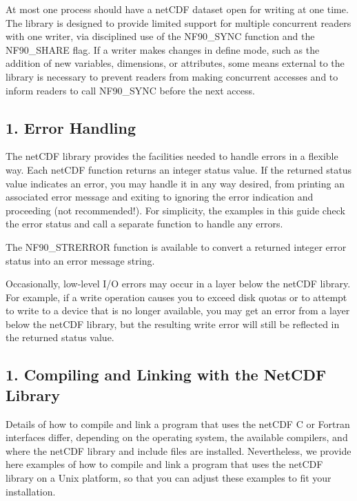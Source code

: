 At most one process should have a net\+C\+DF dataset open for writing at one time. The library is designed to provide limited support for multiple concurrent readers with one writer, via disciplined use of the N\+F90\+\_\+\+S\+Y\+NC function and the N\+F90\+\_\+\+S\+H\+A\+RE flag. If a writer makes changes in define mode, such as the addition of new variables, dimensions, or attributes, some means external to the library is necessary to prevent readers from making concurrent accesses and to inform readers to call N\+F90\+\_\+\+S\+Y\+NC before the next access.\hypertarget{f90-use-of-the-netcdf-library_f90-error-handling}{}\subsection{1. Error Handling }\label{f90-use-of-the-netcdf-library_f90-error-handling}
The net\+C\+DF library provides the facilities needed to handle errors in a flexible way. Each net\+C\+DF function returns an integer status value. If the returned status value indicates an error, you may handle it in any way desired, from printing an associated error message and exiting to ignoring the error indication and proceeding (not recommended!). For simplicity, the examples in this guide check the error status and call a separate function to handle any errors.

The N\+F90\+\_\+\+S\+T\+R\+E\+R\+R\+OR function is available to convert a returned integer error status into an error message string.

Occasionally, low-\/level I/O errors may occur in a layer below the net\+C\+DF library. For example, if a write operation causes you to exceed disk quotas or to attempt to write to a device that is no longer available, you may get an error from a layer below the net\+C\+DF library, but the resulting write error will still be reflected in the returned status value.\hypertarget{f90-use-of-the-netcdf-library_f90-compiling-and-linking-with-the-netcdf-library}{}\subsection{1. Compiling and Linking with the Net\+C\+D\+F Library }\label{f90-use-of-the-netcdf-library_f90-compiling-and-linking-with-the-netcdf-library}
Details of how to compile and link a program that uses the net\+C\+DF C or Fortran interfaces differ, depending on the operating system, the available compilers, and where the net\+C\+DF library and include files are installed. Nevertheless, we provide here examples of how to compile and link a program that uses the net\+C\+DF library on a Unix platform, so that you can adjust these examples to fit your installation.

